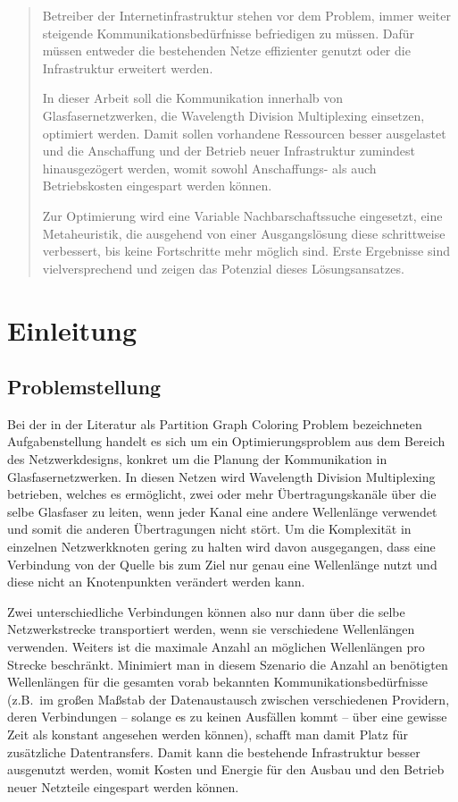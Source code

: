 \documentclass[paper=a4,fontsize=12pt]{scrartcl}
\begin{document}
\tableofcontents
\newpage
\begin{abstract}
Betreiber der Internetinfrastruktur stehen vor dem Problem, immer weiter steigende Kommunikationsbedürfnisse befriedigen zu müssen. Dafür müssen entweder die bestehenden Netze effizienter genutzt oder die Infrastruktur erweitert werden.

In dieser Arbeit soll die Kommunikation innerhalb von Glasfasernetzwerken, die Wavelength Division Multiplexing einsetzen, optimiert werden. Damit sollen vorhandene Ressourcen besser ausgelastet und die Anschaffung und der Betrieb neuer Infrastruktur zumindest hinausgezögert werden, womit sowohl Anschaffungs- als auch Betriebskosten eingespart werden können.

Zur Optimierung wird eine Variable Nachbarschaftssuche eingesetzt, eine Metaheuristik, die ausgehend von einer Ausgangslösung diese schrittweise verbessert, bis keine Fortschritte mehr möglich sind. Erste Ergebnisse sind vielversprechend und zeigen das Potenzial dieses Lösungsansatzes.
\end{abstract}

\section{Einleitung}
\subsection{Problemstellung}
Bei der in der Literatur als Partition Graph Coloring Problem bezeichneten Aufgabenstellung handelt es sich um ein Optimierungsproblem aus dem Bereich des Netzwerkdesigns, konkret um die Planung der Kommunikation in Glasfasernetzwerken. In diesen Netzen wird Wavelength Division Multiplexing betrieben, welches es ermöglicht, zwei oder mehr Übertragungskanäle über die selbe Glasfaser zu leiten, wenn jeder Kanal eine andere Wellenlänge verwendet und somit die anderen Übertragungen nicht stört. Um die Komplexität in einzelnen Netzwerkknoten gering zu halten wird davon ausgegangen, dass eine Verbindung von der Quelle bis zum Ziel nur genau eine Wellenlänge nutzt und diese nicht an Knotenpunkten verändert werden kann.

Zwei unterschiedliche Verbindungen können also nur dann über die selbe Netzwerkstrecke transportiert werden, wenn sie verschiedene Wellenlängen verwenden. Weiters ist die maximale Anzahl an möglichen Wellenlängen pro Strecke beschränkt. Minimiert man in diesem Szenario die Anzahl an benötigten Wellenlängen für die gesamten vorab bekannten Kommunikationsbedürfnisse (z.B.\ im großen Maßstab der Datenaustausch zwischen verschiedenen Providern, deren Verbindungen -- solange es zu keinen Ausfällen kommt -- über eine gewisse Zeit als konstant angesehen werden können), schafft man damit Platz für zusätzliche Datentransfers. Damit kann die bestehende Infrastruktur besser ausgenutzt werden, womit Kosten und Energie für den Ausbau und den Betrieb neuer Netzteile eingespart werden können.
\end{document}
